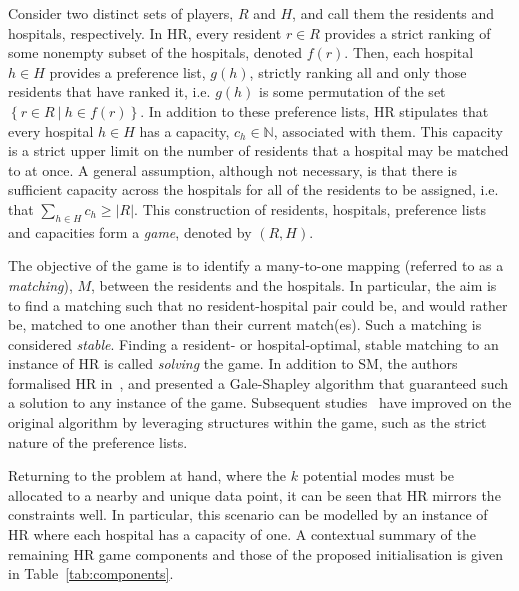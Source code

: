 Consider two distinct sets of players, \(R\) and \(H\), and call them the
residents and hospitals, respectively. In HR, every resident \(r \in R\)
provides a strict ranking of some nonempty subset of the hospitals, denoted
\(f(r)\). Then, each hospital \(h \in H\) provides a preference list, \(g(h)\),
strictly ranking all and only those residents that have ranked it, i.e. \(g(h)\)
is some permutation of the set \(\left\{r \in R \ | \ h \in f(r)\right\}\). In
addition to these preference lists, HR stipulates that every hospital \(h \in
H\) has a capacity, \(c_h \in \mathbb N\), associated with them. This capacity
is a strict upper limit on the number of residents that a hospital may be
matched to at once. A general assumption, although not necessary, is that there
is sufficient capacity across the hospitals for all of the residents to be
assigned, i.e. that \(\sum_{h \in H} c_h \ge \lvert R \rvert\). This
construction of residents, hospitals, preference lists and capacities form a
\emph{game}, denoted by \((R, H)\).

The objective of the game is to identify a many-to-one mapping (referred to as a
\emph{matching}), \(M\), between the residents and the hospitals. In particular,
the aim is to find a matching such that no resident-hospital pair could be, and
would rather be, matched to one another than their current match(es). Such a
matching is considered \emph{stable}. Finding a resident- or hospital-optimal,
stable matching to an instance of HR is called \emph{solving} the game. In
addition to SM, the authors formalised HR in~\cite{Gale1962}, and presented a
Gale-Shapley algorithm that guaranteed such a solution to any instance of the
game. Subsequent studies~\cite{Dubins1981,Roth1984} have improved on the
original algorithm by leveraging structures within the game, such as the strict
nature of the preference lists.

Returning to the problem at hand, where the \(k\) potential modes must
be allocated to a nearby and unique data point, it can be seen that HR mirrors
the constraints well. In particular, this scenario can be modelled by an
instance of HR where each hospital has a capacity of one. A contextual summary
of the remaining HR game components and those of the proposed initialisation is
given in Table~\ref{tab:components}.

